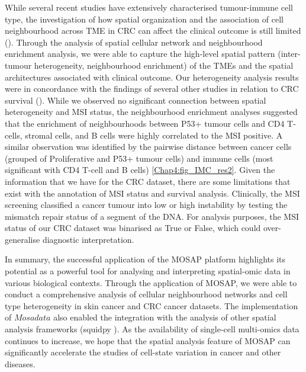 While several recent studies have extensively characterised tumour-immune cell type, the investigation of how spatial organization and the association of cell neighbourhood across TME in CRC can affect the clinical outcome is still limited (\cite{schurch2020coordinated, kather2017silico,newell2018high,blise2022single}). Through the analysis of spatial cellular network and neighbourhood enrichment analysis, we were able to capture the high-level spatial pattern (\ie inter-tumour heterogeneity, neighbourhood enrichment) of the TMEs and the spatial architectures associated with clinical outcome. Our heterogeneity analysis results were in concordance with the findings of several other studies in relation to CRC survival (\cite{schurch2020coordinated, li2017reference}). While we observed no significant connection between spatial heterogeneity and MSI status, the neighbourhood enrichment analyses suggested that the enrichment of neighbourhoods between P53+ tumour cells and CD4 T-cells, stromal cells, and B cells were highly correlated to the MSI positive. A similar observation was identified by the pairwise distance between cancer cells (grouped of Proliferative and P53+ tumour cells) and immune cells (most significant with CD4 T-cell and B cells) \ref{Chap4:fig_IMC_res2}. Given the information that we have for the CRC dataset, there are some limitations that exist with the annotation of MSI status and survival analysis. Clinically, the MSI screening classified a cancer tumour into low or high instability by testing the mismatch repair status of a segment of the DNA. For analysis purposes, the MSI status of our CRC dataset was binarised as True or False, which could over-generalise diagnostic interpretation.      

In summary, the successful application of the MOSAP platform highlights its potential as a powerful tool for analysing and interpreting spatial-omic data in various biological contexts. Through the application of MOSAP, we were able to conduct a comprehensive analysis of cellular neighbourhood networks and cell type heterogeneity in skin cancer and CRC cancer datasets. The implementation of $Mosadata$ also enabled the integration with the analysis of other spatial analysis frameworks (\ie squidpy \cite{palla2022squidpy}). As the availability of single-cell multi-omics data continues to increase, we hope that the spatial analysis feature of MOSAP can significantly accelerate the studies of cell-state variation in cancer and other diseases.   

